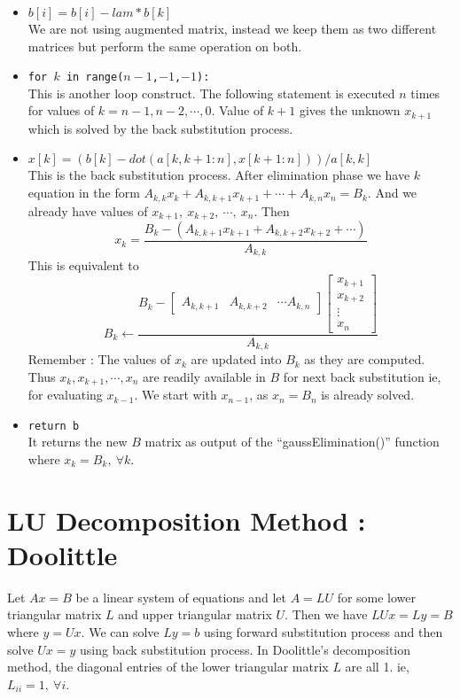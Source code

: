 \begin{remark}
\begin{commentary}
\begin{itemize}
	\item \texttt{$b[i] = b[i]-lam*b[k]$} \\ We are not using augmented matrix, instead we keep them as two different matrices but perform the same operation on both.
	\item \texttt{for $k$ in range($n-1$,$-1$,$-1$):} \\ This is another loop construct. The following statement is executed $n$ times for values of $k = n-1, n-2, \cdots, 0$. Value of $k+1$ gives the unknown $x_{k+1}$ which is solved by the back substitution process.
	\item \texttt{$x[k] = (b[k]-dot(a[k,k+1:n],x[k+1:n]))/a[k,k]$} \\ This is the back substitution process. After elimination phase we have $k$ equation in the form $A_{k,k}x_{k} + A_{k,k+1}x_{k+1}+\cdots+A_{k,n}x_n = B_k$. And we already have values of $x_{k+1},\ x_{k+2},\ \cdots,\ x_n$. Then
	\[x_{k} = \frac{B_k - (A_{k,k+1}x_{k+1} + A_{k,k+2}x_{k+2}+\cdots)}{A_{k,k}}\]
	This is equivalent to 
	\[ B_k \leftarrow \frac{ B_k - \begin{bmatrix}A_{k,k+1} & A_{k,k+2} & \cdots A_{k,n} \end{bmatrix}\begin{bmatrix} x_{k+1} \\ x_{k+2} \\ \vdots \\ x_n \end{bmatrix}}{A_{k,k}} \]
	Remember : The values of $x_k$ are updated into $B_k$ as they are computed. Thus $x_{k}, x_{k+1}, \cdots, x_n$ are readily available in $B$ for next back substitution ie, for evaluating $x_{k-1}$. We start with $x_{n-1}$, as $x_n = B_n$ is already solved.
	\item \texttt{return b} \\ It returns the new $B$ matrix as output of the ``gaussElimination()'' function where $x_k = B_k,\ \forall k$.
\end{itemize}
\end{commentary}
\end{remark}

\section{LU Decomposition Method : Doolittle}
Let $Ax = B$ be a linear system of equations and let $A = LU$ for some lower triangular matrix $L$ and upper triangular matrix $U$. Then we have $LUx = Ly = B$ where $y = Ux$. We can solve $Ly = b$ using forward substitution process and then solve $Ux = y$ using back substitution process. In Doolittle's decomposition method, the diagonal entries of the lower triangular matrix $L$ are all 1. ie, $L_{ii} = 1,\ \forall i$.\\

